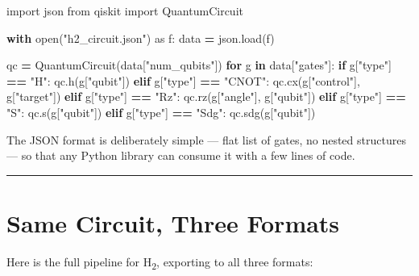 \documentclass[
  11pt,
  oneside]{book}
\newenvironment{Shaded}{\begin{snugshade}}{\end{snugshade}}
\newcommand{\BuiltInTok}[1]{#1}
\newcommand{\ControlFlowTok}[1]{\textcolor[rgb]{0.13,0.29,0.53}{\textbf{#1}}}
\newcommand{\ImportTok}[1]{#1}
\newcommand{\KeywordTok}[1]{\textcolor[rgb]{0.13,0.29,0.53}{\textbf{#1}}}
\newcommand{\NormalTok}[1]{#1}
\newcommand{\OperatorTok}[1]{\textcolor[rgb]{0.81,0.36,0.00}{\textbf{#1}}}
\newcommand{\StringTok}[1]{\textcolor[rgb]{0.31,0.60,0.02}{#1}}
\begin{document}
\begin{Shaded}
\begin{Highlighting}[]
\ImportTok{import}\NormalTok{ json}
\ImportTok{from}\NormalTok{ qiskit }\ImportTok{import}\NormalTok{ QuantumCircuit}

\ControlFlowTok{with} \BuiltInTok{open}\NormalTok{(}\StringTok{"h2\_circuit.json"}\NormalTok{) }\ImportTok{as}\NormalTok{ f:}
\NormalTok{    data }\OperatorTok{=}\NormalTok{ json.load(f)}

\NormalTok{qc }\OperatorTok{=}\NormalTok{ QuantumCircuit(data[}\StringTok{"num\_qubits"}\NormalTok{])}
\ControlFlowTok{for}\NormalTok{ g }\KeywordTok{in}\NormalTok{ data[}\StringTok{"gates"}\NormalTok{]:}
    \ControlFlowTok{if}\NormalTok{ g[}\StringTok{"type"}\NormalTok{] }\OperatorTok{==} \StringTok{"H"}\NormalTok{:}
\NormalTok{        qc.h(g[}\StringTok{"qubit"}\NormalTok{])}
    \ControlFlowTok{elif}\NormalTok{ g[}\StringTok{"type"}\NormalTok{] }\OperatorTok{==} \StringTok{"CNOT"}\NormalTok{:}
\NormalTok{        qc.cx(g[}\StringTok{"control"}\NormalTok{], g[}\StringTok{"target"}\NormalTok{])}
    \ControlFlowTok{elif}\NormalTok{ g[}\StringTok{"type"}\NormalTok{] }\OperatorTok{==} \StringTok{"Rz"}\NormalTok{:}
\NormalTok{        qc.rz(g[}\StringTok{"angle"}\NormalTok{], g[}\StringTok{"qubit"}\NormalTok{])}
    \ControlFlowTok{elif}\NormalTok{ g[}\StringTok{"type"}\NormalTok{] }\OperatorTok{==} \StringTok{"S"}\NormalTok{:}
\NormalTok{        qc.s(g[}\StringTok{"qubit"}\NormalTok{])}
    \ControlFlowTok{elif}\NormalTok{ g[}\StringTok{"type"}\NormalTok{] }\OperatorTok{==} \StringTok{"Sdg"}\NormalTok{:}
\NormalTok{        qc.sdg(g[}\StringTok{"qubit"}\NormalTok{])}
\end{Highlighting}
\end{Shaded}

The JSON format is deliberately simple --- flat list of gates, no nested
structures --- so that any Python library can consume it with a few
lines of code.

\begin{center}\rule{0.5\linewidth}{0.5pt}\end{center}

\section{Same Circuit, Three Formats}\label{same-circuit-three-formats}

Here is the full pipeline for H\textsubscript{2}, exporting to all three formats:
\end{document}
